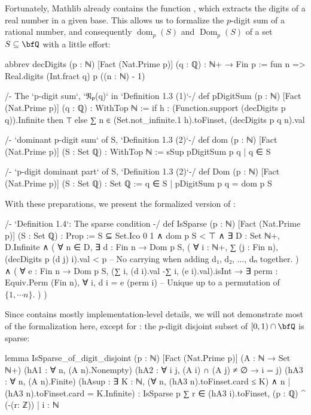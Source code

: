 \documentclass[english,oneside]{smfart}
\newcommand{\opn}[1]{\operatorname{#1}}
\begin{document}
Fortunately, Mathlib already contains the function , which extracts the digits of a real number in a given base. This allows us to formalize the $p$-digit sum of a rational number, and consequently $\opn{dom}_p(S)$ and $\opn{Dom}_p(S)$ of a set $S\subseteq\bfQ$ with a little effort:
\begin{leancode}
abbrev decDigits (p : ℕ) [Fact (Nat.Prime p)] (q : ℚ) : ℕ+ → Fin p :=
  fun n => Real.digits (Int.fract q) p ((n : ℕ) - 1)

/- The `p-digit sum`, `𝔑ₚ(q)` in `Definition 1.3 (1)`-/
def pDigitSum (p : ℕ) [Fact (Nat.Prime p)] (q : ℚ) : WithTop ℕ :=
  if h : (Function.support (decDigits p q)).Infinite then ⊤
  else ∑ n ∈ (Set.not_infinite.1 h).toFinset, (decDigits p q n).val

/- `dominant p-digit sum` of S, `Definition 1.3 (2)`-/
def dom (p : ℕ) [Fact (Nat.Prime p)] (S : Set ℚ) : WithTop ℕ :=
  sSup {pDigitSum p  q | q ∈ S}

/- `p-digit dominant part` of S, `Definition 1.3 (2)`-/
def Dom (p : ℕ) [Fact (Nat.Prime p)] (S : Set ℚ) : Set ℚ :=
  {q ∈ S | pDigitSum p q = dom p S}
\end{leancode}

With these preparations, we present the formalized version of :
\begin{leancode}
/- `Definition 1.4`: The sparse condition -/
def IsSparse (p : ℕ) [Fact (Nat.Prime p)] (S : Set ℚ) : Prop :=
  S ⊆ Set.Ico 0 1 ∧ dom p S < ⊤ ∧
  ∃ D : Set ℕ+, D.Infinite ∧ ( ∀ n ∈ D, ∃ d : Fin n → Dom p S, (
      ∀ i : ℕ+, ∑ (j : Fin n), (decDigits p (d j) i).val < p
      -- No carrying when adding d₁, d₂, ..., dₙ together.
    ) ∧ ( ∀ e : Fin n → Dom p S,
      (∑ i, (d i).val -∑ i, (e i).val).isInt →
        ∃ perm : Equiv.Perm (Fin n), ∀ i, d i = e (perm i)
      -- Unique up to a permutation of $\{1,\cdots n\}$.
    ) )
\end{leancode}

Since  contains mostly implementation-level details, we will not demonstrate most of the formalization here, except for : the $p$-digit disjoint subset of $[0,1)\cap\bfQ$ is sparse:
\begin{leancode}
lemma IsSparse_of_digit_disjoint (p : ℕ) [Fact (Nat.Prime p)] (A : ℕ → Set ℕ+)
(hA1 : ∀ n, (A n).Nonempty) (hA2 : ∀ i j, (A i) ∩ (A j) ≠ ∅ → i = j)
(hA3 : ∀ n, (A n).Finite)
(hAsup : ∃ K : ℕ, (∀ n, (hA3 n).toFinset.card ≤ K) ∧
          {n | (hA3 n).toFinset.card = K}.Infinite) :
  IsSparse p {∑ r ∈ (hA3 i).toFinset, (p : ℚ) ^ (-(r: ℤ)) | i : ℕ }
\end{leancode}
\end{document}
